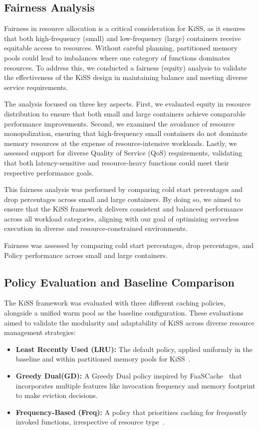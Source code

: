 \subsection{Fairness Analysis}

Fairness in resource allocation is a critical consideration for KiSS, as it ensures that both high-frequency (small) and low-frequency (large) containers receive equitable access to resources. Without careful planning, partitioned memory pools could lead to imbalances where one category of functions dominates resources. To address this, we conducted a fairness (equity) analysis to validate the effectiveness of the KiSS design in maintaining balance and meeting diverse service requirements.

The analysis focused on three key aspects. First, we evaluated equity in resource distribution to ensure that both small and large containers achieve comparable performance improvements. Second, we examined the avoidance of resource monopolization, ensuring that high-frequency small containers do not dominate memory resources at the expense of resource-intensive workloads. Lastly, we assessed support for diverse Quality of Service (QoS) requirements, validating that both latency-sensitive and resource-heavy functions could meet their respective performance goals.

This fairness analysis was performed by comparing cold start percentages and drop percentages across small and large containers. By doing so, we aimed to ensure that the KiSS framework delivers consistent and balanced performance across all workload categories, aligning with our goal of optimizing serverless execution in diverse and resource-constrained environments.



Fairness was assessed by comparing cold start percentages, drop percentages, and Policy performance across small and large containers.

\subsection{Policy Evaluation and Baseline Comparison}

The KiSS framework was evaluated with three different caching policies, alongside a unified warm pool as the baseline configuration. These evaluations aimed to validate the modularity and adaptability of KiSS across diverse resource management strategies:
\begin{itemize}
    \item \textbf{Least Recently Used (LRU):} The default policy, applied uniformly in the baseline and within partitioned memory pools for KiSS~\cite{jonas_cloud_2019,alexander_faascache_2021}.
    \item \textbf{Greedy Dual(GD):} A Greedy Dual policy inspired by FaaSCache~\cite{alexander_faascache_2021} that incorporates multiple features like invocation frequency and memory footprint to make eviction decisions.
    \item \textbf{Frequency-Based (Freq):} A policy that prioritizes caching for frequently invoked functions, irrespective of resource type~\cite{alexander_faascache_2021}.
\end{itemize}


